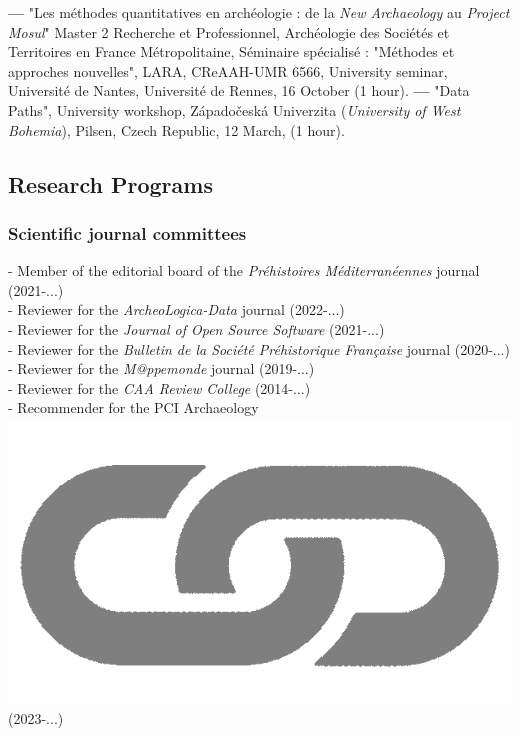 \documentclass{article}
\begin{document}
\smallbreak
\textbf{--- }"Les m\'{e}thodes quantitatives en arch\'{e}ologie : de la \textit{New Archaeology} au \textit{Project Mosul}" Master 2 Recherche et Professionnel, Arch\'{e}ologie des Soci\'{e}t\'{e}s et Territoires en France M\'{e}tropolitaine, S\'{e}minaire sp\'{e}cialis\'{e} : "M\'{e}thodes et approches nouvelles", LARA, CReAAH-UMR 6566, University seminar, Universit\'{e} de Nantes, Universit\'{e} de Rennes, 16 October (1 hour).
\smallbreak
\textbf{--- }"Data Paths", University workshop, Z\'{a}pado\v{c}esk\'{a} Univerzita (\textit{University of West Bohemia}), Pilsen, Czech Republic, 12 March, (1 hour).

\subsection*{Research Programs}

\subsubsection*{Scientific journal committees}

- Member of the editorial board of the \textit{Pr\'ehistoires M\'editerran\'eennes} journal (2021-...)\\ 
- Reviewer for the \textit{ArcheoLogica-Data} journal (2022-...)\\
- Reviewer for the \textit{Journal of Open Source Software} (2021-...)\\
- Reviewer for the \textit{Bulletin de la Soci\'{e}t\'{e} Pr\'{e}historique Fran\c{c}aise} journal (2020-...)\\
- Reviewer for the \textit{M@ppemonde} journal (2019-...)\\ 
- Reviewer for the \textit{CAA Review College} (2014-...)\\ 
- Recommender for the PCI Archaeology \href{https://archaeo.peercommunityin.org/public/user_public_page?userId=1235}{\includegraphics[scale=0.02]{link_grey.png}} (2023-...)\\
\end{document}
